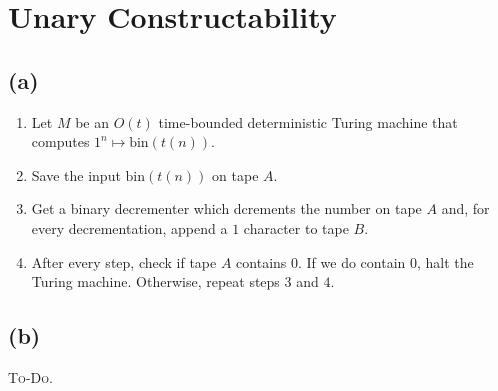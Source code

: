 



\section{Unary Constructability}

\subsection{(a)}
\begin{enumerate}
\item Let $M$ be an $O(t)$ time-bounded deterministic Turing machine that computes $1^{n}\mapsto \text{bin}(t(n))$.
\item Save the input $\text{bin}(t(n))$ on tape $A$.
\item Get a binary decrementer which dcrements the number on tape $A$ and, for every decrementation, append a $1$ character to tape $B$.
\item After every step, check if tape $A$ contains $0$. If we do contain $0$, halt the Turing machine. Otherwise, repeat steps $3$ and $4$.
\end{enumerate}

\subsection{(b)}
\textsc{To-Do.}


